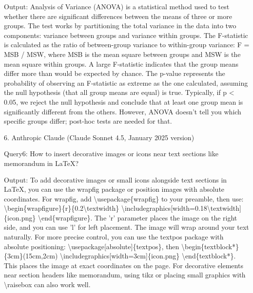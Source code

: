 \documentclass{mcmthesis}
\begin{document}
Output: Analysis of Variance (ANOVA) is a statistical method used to test whether there are significant differences between the means of three or more groups. The test works by partitioning the total variance in the data into two components: variance between groups and variance within groups. The F-statistic is calculated as the ratio of between-group variance to within-group variance: F = MSB / MSW, where MSB is the mean square between groups and MSW is the mean square within groups. A large F-statistic indicates that the group means differ more than would be expected by chance. The p-value represents the probability of observing an F-statistic as extreme as the one calculated, assuming the null hypothesis (that all group means are equal) is true. Typically, if p < 0.05, we reject the null hypothesis and conclude that at least one group mean is significantly different from the others. However, ANOVA doesn't tell you which specific groups differ; post-hoc tests are needed for that.


6. Anthropic Claude (Claude Sonnet 4.5, January 2025 version)

Query6: How to insert decorative images or icons near text sections like memorandum in LaTeX?

Output: To add decorative images or small icons alongside text sections in LaTeX, you can use the wrapfig package or position images with absolute coordinates. For wrapfig, add \textbackslash usepackage\{wrapfig\} to your preamble, then use: \textbackslash begin\{wrapfigure\}\{r\}\{0.2\textbackslash textwidth\} \textbackslash includegraphics[width=0.18\textbackslash textwidth]\{icon.png\} \textbackslash end\{wrapfigure\}. The 'r' parameter places the image on the right side, and you can use 'l' for left placement. The image will wrap around your text naturally. For more precise control, you can use the textpos package with absolute positioning: \textbackslash usepackage[absolute]\{textpos\}, then \textbackslash begin\{textblock*\}\{3cm\}(15cm,2cm) \textbackslash includegraphics[width=3cm]\{icon.png\} \textbackslash end\{textblock*\}. This places the image at exact coordinates on the page. For decorative elements near section headers like memorandum, using tikz or placing small graphics with \textbackslash raisebox can also work well.
\end{document}
